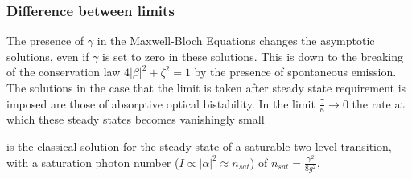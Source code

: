 \subsubsection{Difference between limits}\cite{Alsing1990}
  The presence of $\gamma$ in the Maxwell-Bloch Equations changes the asymptotic solutions, even if $\gamma$ is set to zero in these solutions. This is down to the breaking of the conservation law $4|\beta|^2 +\zeta^2 = 1$ by the presence of spontaneous emission. The solutions in the case that the limit is taken after steady state requirement is imposed are those of absorptive optical bistability. In the limit $\frac{\gamma}{\kappa} \rightarrow 0$ the rate at which these steady states becomes vanishingly small

 is the classical solution for the steady state of a saturable two level transition, with a saturation photon number ($I \propto |\alpha|^2 \approx n_{sat}$) of $n_{sat} = \frac{\gamma^2}{8g^2}$.

